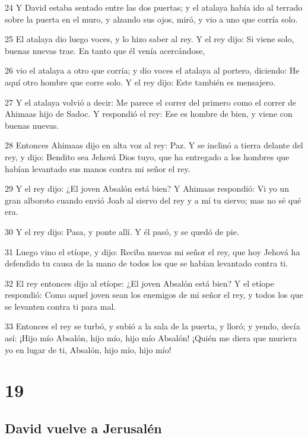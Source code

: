 \par 24 Y David estaba sentado entre las dos puertas; y el atalaya había ido al terrado sobre la puerta en el muro, y alzando sus ojos, miró, y vio a uno que corría solo.
\par 25 El atalaya dio luego voces, y lo hizo saber al rey. Y el rey dijo: Si viene solo, buenas nuevas trae. En tanto que él venía acercándose,
\par 26 vio el atalaya a otro que corría; y dio voces el atalaya al portero, diciendo: He aquí otro hombre que corre solo. Y el rey dijo: Este también es mensajero.
\par 27 Y el atalaya volvió a decir: Me parece el correr del primero como el correr de Ahimaas hijo de Sadoc. Y respondió el rey: Ese es hombre de bien, y viene con buenas nuevas.
\par 28 Entonces Ahimaas dijo en alta voz al rey: Paz. Y se inclinó a tierra delante del rey, y dijo: Bendito sea Jehová Dios tuyo, que ha entregado a los hombres que habían levantado sus manos contra mi señor el rey.
\par 29 Y el rey dijo: ¿El joven Absalón está bien? Y Ahimaas respondió: Vi yo un gran alboroto cuando envió Joab al siervo del rey y a mí tu siervo; mas no sé qué era.
\par 30 Y el rey dijo: Pasa, y ponte allí. Y él pasó, y se quedó de pie.
\par 31 Luego vino el etíope, y dijo: Reciba nuevas mi señor el rey, que hoy Jehová ha defendido tu causa de la mano de todos los que se habían levantado contra ti.
\par 32 El rey entonces dijo al etíope: ¿El joven Absalón está bien? Y el etíope respondió: Como aquel joven sean los enemigos de mi señor el rey, y todos los que se levanten contra ti para mal.
\par 33 Entonces el rey se turbó, y subió a la sala de la puerta, y lloró; y yendo, decía así: ¡Hijo mío Absalón, hijo mío, hijo mío Absalón! ¡Quién me diera que muriera yo en lugar de ti, Absalón, hijo mío, hijo mío! 

\chapter{19}

\section*{David vuelve a Jerusalén}


